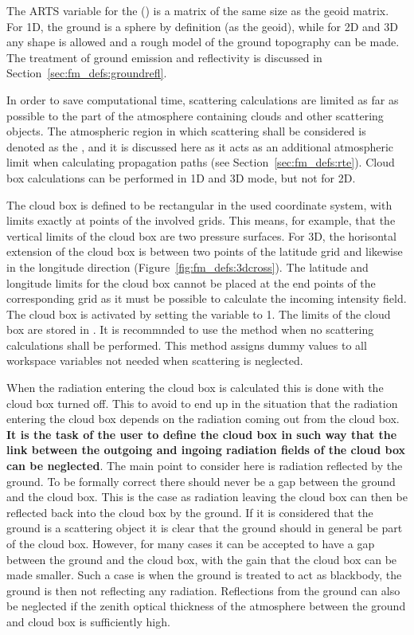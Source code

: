 The ARTS variable for the 
() is a matrix of the same size as the geoid
matrix. For 1D, the ground is a sphere by definition (as the geoid),
while for 2D and 3D any shape is allowed and a rough model of the
ground topography can be made. The treatment of ground emission
and reflectivity is discussed in Section~\ref{sec:fm_defs:groundrefl}.


\label{sec:fm_defs:cloudbox}

In order to save computational time, scattering calculations are
limited as far as possible to the part of the atmosphere containing
clouds and other scattering objects. The atmospheric region in which
scattering shall be considered is denoted as the , and it is discussed here as it acts as an additional
atmospheric limit when calculating propagation paths (see
Section~\ref{sec:fm_defs:rte}). Cloud box calculations can be
performed in 1D and 3D mode, but not for 2D.

The cloud box is defined to be rectangular in the used coordinate
system, with limits exactly at points of the involved grids. This
means, for example, that the vertical limits of the cloud box are two
pressure surfaces. For 3D, the horisontal extension of the cloud box
is between two points of the latitude grid and likewise in the
longitude direction (Figure~\ref{fig:fm_defs:3dcross}). The latitude
and longitude limits for the cloud box cannot be placed at the end
points of the corresponding grid as it must be possible to calculate
the incoming intensity field. The cloud box is activated by setting
the variable  to 1.  The limits of the cloud
box are stored in .  It is recommnded to
use the method  when no scattering calculations
shall be performed. This method assigns dummy values to all workspace
variables not needed when scattering is neglected.

When the radiation entering the cloud box is calculated this is done
with the cloud box turned off. This to avoid to end up in the
situation that the radiation entering the cloud box depends on the
radiation coming out from the cloud box. {\bf It is the task of the
  user to define the cloud box in such way that the link between the
  outgoing and ingoing radiation fields of the cloud box can be
  neglected}. The main point to consider here is radiation reflected
by the ground. To be formally correct there should never be a gap
between the ground and the cloud box. This is the case as radiation
leaving the cloud box can then be reflected back into the cloud box by
the ground. If it is considered that the ground is a scattering object
it is clear that the ground should in general be part of the cloud
box. However, for many cases it can be accepted to have a gap between
the ground and the cloud box, with the gain that the cloud box can be
made smaller. Such a case is when the ground is treated to act as
blackbody, the ground is then not reflecting any radiation.
Reflections from the ground can also be neglected if the zenith
optical thickness of the atmosphere between the ground and cloud box
is sufficiently high.



